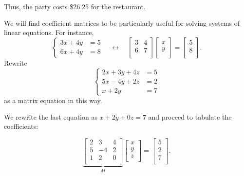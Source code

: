 \documentclass[../key.tex]{subfiles}
\begin{document}
Thus, the party costs \$26.25 for the restaurant.

\begin{outer_problem}
\item We will find coefficient matrices to be particularly useful for solving systems of linear equations. For instance, $$\begin{cases}3x+4y&=5 \\ 6x+4y &= 8\end{cases}\quad\longleftrightarrow\quad\left[\begin{array}{cc} 3 & 4 \\ 6 & 7 \\ \end{array}\right]\left[\begin{array}{c} x \\ y \\ \end{array}\right]=\left[\begin{array}{c} 5 \\ 8 \\ \end{array}\right].$$ Rewrite $$\begin{cases}2x+3y+4z&=5 \\ 5x-4y+2z &= 2 \\ x+2y &= 7\end{cases}$$ as a matrix equation in this way.
\end{outer_problem}

We rewrite the last equation as $x+2y+0z=7$ and proceed to tabulate the coefficients:

$$\underbrace{\begin{bmatrix}
2 & 3 & 4 \\
5 & -4 & 2 \\
1 & 2 & 0 \\
\end{bmatrix}}_{M} \begin{bmatrix}
x \\
y \\
z \\
\end{bmatrix} = \begin{bmatrix}
5 \\
2 \\
7 \\
\end{bmatrix}.$$

\begin{outer_problem}
\item
\end{outer_problem}
\end{document}
